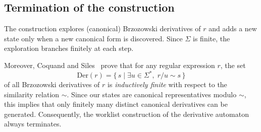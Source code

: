 \subsection{Termination of the construction}\label{subsec:dfa-termination}

The construction explores (canonical) Brzozowski derivatives of $r$ and adds a new state
only when a new canonical form is discovered. Since $\Sigma$ is finite, the exploration
branches finitely at each step.

Moreover, Coquand and Siles~\cite{CoquandRegexEquality} prove that for any regular
expression $r$, the set
\[
\mathrm{Der}(r)=\{\, s \mid \exists u\in\Sigma^*,\; r/u \sim s \,\}
\]
of all Brzozowski derivatives of $r$ is \emph{inductively finite} with respect to the
similarity relation $\sim$. Since our states are canonical representatives modulo $\sim$,
this implies that only finitely many distinct canonical derivatives can be generated.
Consequently, the worklist construction of the derivative automaton always terminates.
